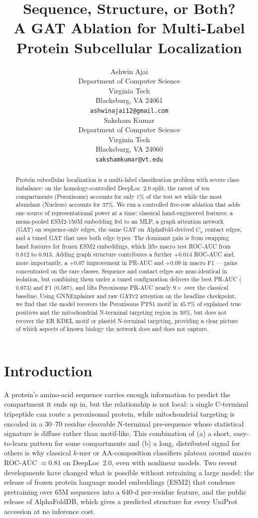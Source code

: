 \documentclass{article}
\title{Sequence, Structure, or Both?\\
A GAT Ablation for Multi-Label Protein Subcellular Localization}
\author{%
  Ashwin Ajai\\
  Department of Computer Science\\
  Virginia Tech\\
  Blacksburg, VA 24061\\
  \texttt{ashwinajai12@gmail.com}\\
  \And
  Saksham Kumar\\
  Department of Computer Science\\
  Virginia Tech\\
  Blacksburg, VA 24060\\
  \texttt{sakshamkumar@vt.edu}\\
}
\begin{document}
\maketitle

\begin{abstract}
Protein subcellular localization is a multi-label classification
problem with severe class imbalance: on the homology-controlled
DeepLoc~2.0 split, the rarest of ten compartments (Peroxisome) accounts
for only $1\%$ of the test set while the most abundant (Nucleus)
accounts for $37\%$. We run a controlled five-row ablation that adds
one source of representational power at a time: classical
hand-engineered features, a mean-pooled ESM2-150M embedding fed to an
MLP, a graph attention network (GAT) on sequence-only edges, the same
GAT on AlphaFold-derived $C_\alpha$ contact edges, and a tuned GAT that
uses both edge types. The dominant gain is from swapping hand features
for frozen ESM2 embeddings, which lifts macro test ROC-AUC from $0.812$
to $0.913$. Adding graph structure contributes a further $+0.014$
ROC-AUC and, more importantly, a $+0.07$ improvement in PR-AUC and
$+0.09$ in macro F1 --- gains concentrated on the rare classes. Sequence
and contact edges are near-identical in isolation, but combining them
under a tuned configuration delivers the best PR-AUC ($0.673$) and F1
($0.587$), and lifts Peroxisome PR-AUC nearly $9\times$ over the
classical baseline. Using GNNExplainer and raw GATv2 attention on the
headline checkpoint, we find that the model recovers the Peroxisome
PTS1 motif in $45.7\%$ of explained true positives and the mitochondrial
N-terminal targeting region in $30\%$, but does not recover the ER KDEL
motif or plastid N-terminal targeting, providing a clear picture of
which aspects of known biology the network does and does not capture.
\end{abstract}

\section{Introduction}\label{sec:intro}

A protein's amino-acid sequence carries enough information to predict the
compartment it ends up in, but the relationship is not local: a single
C-terminal tripeptide can route a peroxisomal protein, while
mitochondrial targeting is encoded in a 30--70 residue cleavable
N-terminal pre-sequence whose statistical signature is diffuse rather
than motif-like. This combination of (a) a short, easy-to-learn pattern
for some compartments and (b) a long, distributed signal for others is
why classical $k$-mer or AA-composition classifiers plateau around macro
ROC-AUC $\approx 0.81$ on DeepLoc~2.0, even with nonlinear models.
Two recent developments have changed what is possible without retraining
a large model: the release of frozen protein language model embeddings
(ESM2) that condense pretraining over 65M sequences into a 640-d
per-residue feature, and the public release of AlphaFoldDB, which gives
a predicted structure for every UniProt accession at no inference cost.
\end{document}

